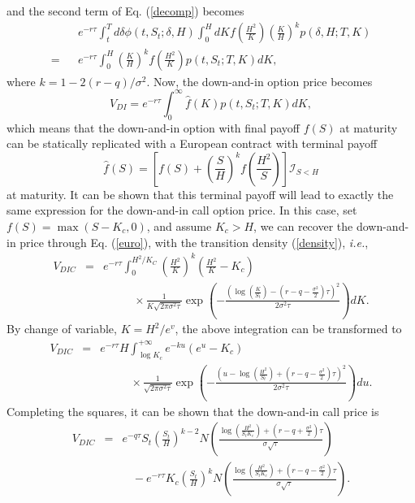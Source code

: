 \documentclass[12pt]{article}
\begin{document}
  and the second term of Eq. (\ref{decomp}) becomes
  \begin{eqnarray}
      &&e^{-r\tau}\int_t^Td\delta \phi(t,S_t;\delta,H)\int_0^HdK f\left(\frac{H^2}{K}\right)\left(\frac{K}{H}\right)^kp\left(\delta,H;T,K\right)\nonumber\\
    = &&e^{-r\tau}\int_0^H \left(\frac{K}{H}\right)^kf\left(\frac{H^2}{K}\right)p\left(t, S_t;T,K\right)dK,
  \end{eqnarray}
  where $k=1-2(r-q)/\sigma^2$. Now, the down-and-in option price becomes
  \begin{equation}
    V_{DI} = e^{-r\tau}\int_0^{\infty} \hat{f}(K)p\left(t, S_t;T,K\right)dK,
  \end{equation}
  which means that the down-and-in option with final payoff $f(S)$ at maturity can be statically replicated with
  a European contract with terminal payoff \cite{CarrChou}
  \begin{equation}
    \hat{f}(S) = \left[f(S) + \left(\frac{S}{H}\right)^kf\left(\frac{H^2}{S}\right)\right]\mathcal{I}_{S<H}
  \end{equation}
  at maturity. It can be shown that this terminal payoff will lead to exactly the same expression for the
  down-and-in call option price. In this case, set $f(S)=\max(S-K_c,0)$, and assume $K_c>H$, we can recover
  the down-and-in price through Eq. (\ref{euro}), with the transition density (\ref{density}), {\it i.e.},
  \begin{eqnarray}
    V_{DIC} &=& e^{-r\tau}\int_0^{H^2/K_C}\left(\frac{H^2}{K}\right)^k\left(\frac{H^2}{K}-K_c\right)\nonumber\\
              &&\ \ \ \ \ \ \ \ \ \ \ \ \times\frac{1}{K\sqrt{2\pi\sigma^2\tau}}
    \exp\left(-\frac{\displaystyle \left(\log\left(\frac{K}{S_t}\right)-\left(r-q-\frac{\sigma^2}{2}\right)\tau\right)^2}{2\sigma^2\tau}\right)dK.
  \end{eqnarray}
  By change of variable, $K=H^2/e^v$, the above integration can be transformed to
  \begin{eqnarray}
    V_{DIC} &=& e^{-r\tau}H\int_{\log K_c}^{+\infty}e^{-ku}\left(e^u-K_c\right)\nonumber\\
              &&\ \ \ \ \ \ \ \ \ \ \ \ \times\frac{1}{\sqrt{2\pi\sigma^2\tau}}
    \exp\left(-\frac{\displaystyle \left(u-\log\left(\frac{H^2}{S_t}\right)+\left(r-q-\frac{\sigma^2}{2}\right)\tau\right)^2}{2\sigma^2\tau}\right)du.
  \end{eqnarray}
  Completing the squares, it can be shown that the down-and-in call price is
  \begin{eqnarray}
    V_{DIC} &=& e^{-q\tau}S_t\left(\frac{S_t}{H}\right)^{k-2}
              N\left(\frac{\displaystyle \log\left(\frac{H^2}{S_tK_c}\right)+\left(r-q+\frac{\sigma^2}{2}\right)\tau}{\sigma\sqrt{\tau}}\right)\nonumber\\
            &&\ \ \ \ - e^{-r\tau}K_c\left(\frac{S_t}{H}\right)^{k}
              N\left(\frac{\displaystyle \log\left(\frac{H^2}{S_tK_c}\right)+\left(r-q-\frac{\sigma^2}{2}\right)\tau}{\sigma\sqrt{\tau}}\right).
  \end{eqnarray}
\end{document}
